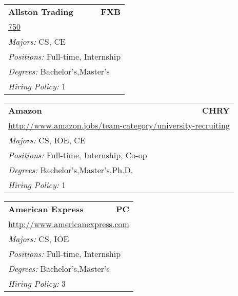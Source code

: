 \documentclass[twoside]{article}
\begin{document}
\begin{center}
\begin{multicols}{3}
\begin{FlushLeft}
\begin{minipage}{\columnwidth}
\end{minipage}
 
\begin{minipage}{\columnwidth}\begin{tabularx}{.95\columnwidth}{Xr}
                 {\Large\bf Allston Trading} & {\Large\bf FXB}\\
    \multicolumn{2}{p{.95\columnwidth}}{\url{750}}\\
    \multicolumn{2}{p{.95\columnwidth}}{\emph{Majors:} CS, CE}\\
    \multicolumn{2}{p{.95\columnwidth}}{\emph{Positions:} Full-time, Internship}\\
    \multicolumn{2}{p{.95\columnwidth}}{\emph{Degrees:} Bachelor's,Master's}\\
    \multicolumn{2}{p{.95\columnwidth}}{\emph{Hiring Policy:} 1}\\
    \end{tabularx}
    
\end{minipage}
 
\begin{minipage}{\columnwidth}\begin{tabularx}{.95\columnwidth}{Xr}
                 {\Large\bf Amazon} & {\Large\bf CHRY}\\
    \multicolumn{2}{p{.95\columnwidth}}{\url{http://www.amazon.jobs/team-category/university-recruiting}}\\
    \multicolumn{2}{p{.95\columnwidth}}{\emph{Majors:} CS, IOE, CE}\\
    \multicolumn{2}{p{.95\columnwidth}}{\emph{Positions:} Full-time, Internship, Co-op}\\
    \multicolumn{2}{p{.95\columnwidth}}{\emph{Degrees:} Bachelor's,Master's,Ph.D.}\\
    \multicolumn{2}{p{.95\columnwidth}}{\emph{Hiring Policy:} 1}\\
    \end{tabularx}
    
\end{minipage}
 
\begin{minipage}{\columnwidth}\begin{tabularx}{.95\columnwidth}{Xr}
                 {\Large\bf American Express} & {\Large\bf PC}\\
    \multicolumn{2}{p{.95\columnwidth}}{\url{http://www.americanexpress.com}}\\
    \multicolumn{2}{p{.95\columnwidth}}{\emph{Majors:} CS, IOE}\\
    \multicolumn{2}{p{.95\columnwidth}}{\emph{Positions:} Full-time, Internship}\\
    \multicolumn{2}{p{.95\columnwidth}}{\emph{Degrees:} Bachelor's,Master's}\\
    \multicolumn{2}{p{.95\columnwidth}}{\emph{Hiring Policy:} 3}\\
    \end{tabularx}
    

\end{minipage}
\end{FlushLeft}
\end{multicols}
\end{center}
\end{document}
